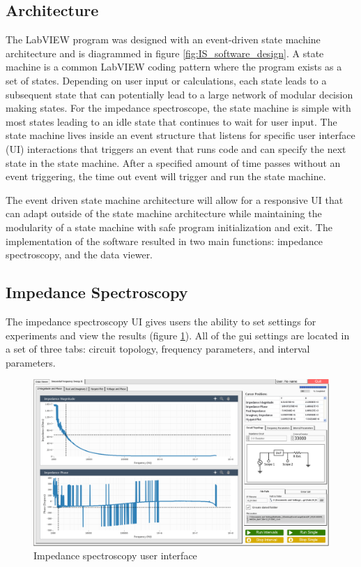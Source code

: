 \subsection{Architecture}

\par The LabVIEW program was designed with an event-driven state machine architecture and is diagrammed in figure \ref{fig:IS_software_design}. A state machine is a common LabVIEW coding pattern where the program exists as a set of states. Depending on user input or calculations, each state leads to a subsequent state that can potentially lead to a large network of modular decision making states. For the impedance spectroscope, the state machine is simple with most states leading to an idle state that continues to wait for user input. The state machine lives inside an event structure that listens for specific user interface (UI) interactions that triggers an event that runs code and can specify the next state in the state machine. After a specified amount of time passes without an event triggering, the time out event will trigger and run the state machine.    

\par The event driven state machine architecture will allow for a responsive UI that can adapt outside of the state machine architecture while maintaining the modularity of a state machine with safe program initialization and exit. The implementation of the software resulted in two main functions: impedance spectroscopy, and the data viewer.

\subsection{Impedance Spectroscopy}
\par The impedance spectroscopy UI gives users the ability to set settings for experiments and view the results (figure \ref{fig:is_gui}). All of the gui settings are located in a set of three tabs: circuit topology, frequency parameters, and interval parameters. 

\begin{figure}[h]
    \centering
    \includegraphics[width=\textwidth]{images/IS_gui.png}
    \caption{Impedance spectroscopy user interface}
    \label{fig:is_gui}
\end{figure}

